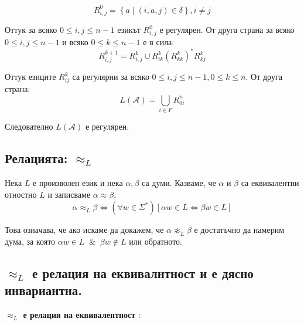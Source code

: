 \documentclass{article}
\renewcommand{\\}{\newline}
\newcommand{\amp}{\;\&\;}
\newcommand{\sep}{\;|\;}
\begin{document}
    \[
      R^{0}_{i, j} = \left\{a \sep (i, a, j) \in \delta\right\}, i \not= j
    \] 

    Оттук за всяко \(0 \leq i, j \leq n - 1\) езикът \(R^{0}_{i, j}\) е регулярен. От друга страна за всяко \(0 \leq i, j \leq n-1\) и всяко \( 0 \leq k \leq n-1\) е в сила:\[
      R_{i, j}^{k+1} = R_{i, j}^{k} \cup R_{ik}^{k}(R_{kk}^{k})^{*}R_{kj}^{k}
    \]     

    Оттук езиците \(R_{ij}^{k}\)  са регулярни за всяко \(0 \leq i, j \leq n-1, 0 \leq k \leq n\). От друга страна:\[
      L(\mathcal{A}) = \bigcup_{i \in F}R_{0i}^{n}
    \] 

    Следователно \(L(\mathcal{A})\) е регулярен. 

    \subsection{Релацията: \(\approx_{L}\)}
    Нека \(L\) е произволен език и нека \(\alpha, \beta\) са думи. Казваме, че \(\alpha\) и \(\beta\) са еквивалентни отностно \(L\) и записваме \(\alpha \approx \beta\),\[
      \alpha \approx_{L} \beta \iff (\forall w \in \Sigma^{*})[\alpha w \in L \iff \beta w \in L]
  \] 
  
  Това означава, че ако искаме да докажем, че \(\alpha \not\approx_{L} \beta\) е достатъчно да намерим дума, за която \(\alpha w \in L \;\amp\; \beta w \not\in L\) или обратното.  

  \subsection{\(\approx_{L}\) е релация на еквивалнтност и е дясно инвариантна. } 
    \textbf{\(\approx_{L}\) е релация на еквивалентност }:
\end{document}
